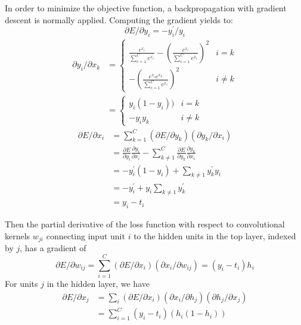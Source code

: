 In order to minimize the objective function, a backpropagation with gradient descent is normally applied. Computing the gradient yields to:
\begin{equation}
\partial E/\partial y_i =-y_i^{'}/y_i 
\end{equation}
\begin{equation}
\begin{split}
\partial y_i/\partial x_k&=\left\{\begin{matrix}
\frac{e^{x_i}}{\sum_{c=1}^{C}e^{x_c}}-(\frac{e^{x_i}}{\sum_{c=1}^{C}e^{x_c}})^2 & i=k\\ 
-(\frac{e^{x_i}e^{x_k}}{\sum_{c=1}^{C}e^{x_c}})^2
& i\neq k
\end{matrix}\right. \\
&=\left\{\begin{matrix}
y_i(1-y_i)) &i=k \\ 
 -y_iy_k& i\neq k
\end{matrix}\right.
\end{split}
\end{equation}
\begin{equation}
\begin{split}
\partial E/\partial x_i&=\sum_{k=1}^{C}(\partial E/\partial y_k)(\partial y_k/\partial x_i) \\&=
\frac{\partial E}{\partial y_i} \frac{\partial y_i}{\partial x_i}-\sum_{k\neq 1}^{C}\frac{\partial E}{\partial y_k}\frac{\partial y_k}{\partial x_i}\\&=-y_i^{'}(1-y_i)+\sum_{k\neq 1}y_k^{'}y_i\\&=-y_i^{'}+y_i\sum_{k\neq 1}y_k^{'}\\&=y_i-t_i
\end{split}
\end{equation}

Then the partial derivative of the loss function with respect to convolutional kernels $w_{ji}$ connecting input unit $i$ to the hidden units in the top layer, indexed by $j$, has a gradient of
\begin{equation}
\partial E/\partial w_{ij}=\sum_{i=1}^{C}(\partial E/\partial x_i)(\partial x_i/\partial w_{ij})=(y_i-t_i)h_i
\end{equation}
For units $j$ in the hidden layer, we have
\begin{equation}
\begin{split}
\partial E/\partial x_{j}&=\sum_{i}(\partial E/\partial x_i)(\partial x_i/\partial h_j)(\partial h_j/\partial x_j)\\ &=\sum_{i=1}^{C}(y_i-t_i)(h_i(1-h_i))
\end{split}
\end{equation}

